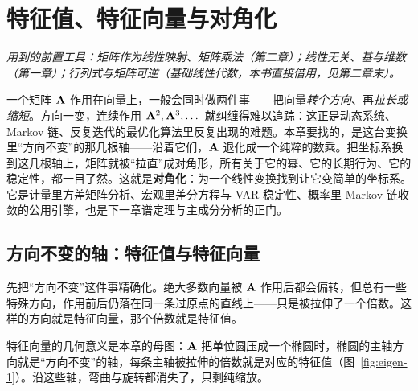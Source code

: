 \chapter{特征值、特征向量与对角化}
\label{ch:eigen}

\noindent\emph{用到的前置工具：矩阵作为线性映射、矩阵乘法（第二章）；线性无关、基与维数（第一章）；行列式与矩阵可逆（基础线性代数，本书直接借用，见第二章末）。}
\medskip

一个矩阵 $\mathbf{A}$ 作用在向量上，一般会同时做两件事——把向量\emph{转个方向}、再\emph{拉长或缩短}。方向一变，连续作用 $\mathbf{A}^2,\mathbf{A}^3,\dots$ 就纠缠得难以追踪：这正是动态系统、Markov 链、反复迭代的最优化算法里反复出现的难题。本章要找的，是这台变换里``方向不变''的那几根轴——沿着它们，$\mathbf{A}$ 退化成一个纯粹的数乘。把坐标系换到这几根轴上，矩阵就被``拉直''成对角形，所有关于它的幂、它的长期行为、它的稳定性，都一目了然。这就是\textbf{对角化}：为一个线性变换找到让它变简单的坐标系。它是计量里方差矩阵分析、宏观里差分方程与 VAR 稳定性、概率里 Markov 链收敛的公用引擎，也是下一章谱定理与主成分分析的正门。

\section{方向不变的轴：特征值与特征向量}
\label{sec:eigen-1}

先把``方向不变''这件事精确化。绝大多数向量被 $\mathbf{A}$ 作用后都会偏转，但总有一些特殊方向，作用前后仍落在同一条过原点的直线上——只是被拉伸了一个倍数。这样的方向就是特征向量，那个倍数就是特征值。



特征向量的几何意义是本章的母图：$\mathbf{A}$ 把单位圆压成一个椭圆时，椭圆的主轴方向就是``方向不变''的轴，每条主轴被拉伸的倍数就是对应的特征值（图~\ref{fig:eigen-1}）。沿这些轴，弯曲与旋转都消失了，只剩纯缩放。

